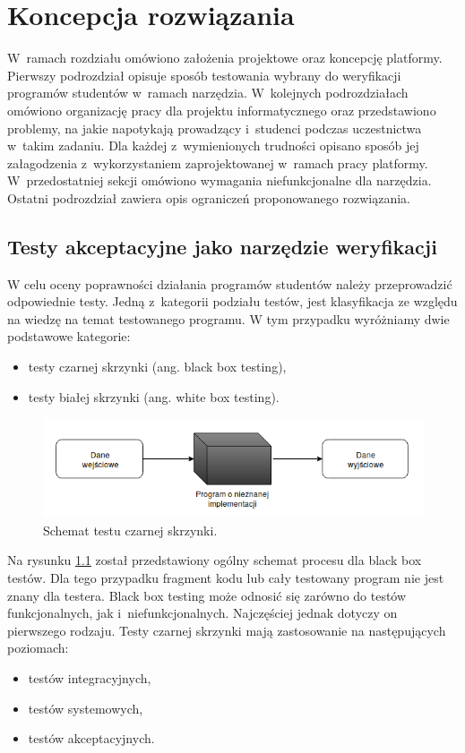 \chapter{Koncepcja rozwiązania}
\label{chapter:requirements}

W~ramach rozdziału omówiono założenia projektowe oraz koncepcję platformy.
Pierwszy podrozdział opisuje sposób testowania wybrany do weryfikacji programów studentów w~ramach narzędzia.
W~kolejnych podrozdziałach omówiono organizację pracy dla projektu informatycznego oraz przedstawiono problemy, na jakie napotykają prowadzący i~studenci podczas uczestnictwa w~takim zadaniu.
Dla każdej z~wymienionych trudności opisano sposób jej załagodzenia z~wykorzystaniem zaprojektowanej w~ramach pracy platformy.
W~przedostatniej sekcji omówiono wymagania niefunkcjonalne dla narzędzia.
Ostatni podrozdział zawiera opis ograniczeń proponowanego rozwiązania.

\section{Testy akceptacyjne jako narzędzie weryfikacji}

W celu oceny poprawności działania programów studentów należy przeprowadzić odpowiednie testy.
Jedną z~kategorii podziału testów, jest klasyfikacja ze względu na wiedzę na temat testowanego programu.
W tym przypadku wyróżniamy dwie podstawowe kategorie:
\begin{itemize}
    \item testy czarnej skrzynki (ang. black box testing),
    \item testy białej skrzynki (ang. white box testing).
\end{itemize}

\begin{figure}[h]
    \centering
    \includegraphics[width = 13cm]{chapter02/black-box.png}
    \caption{Schemat testu czarnej skrzynki.}
    \label{fig:black-box}
\end{figure}

Na rysunku \ref{fig:black-box} został przedstawiony ogólny schemat procesu dla black box testów.
Dla tego przypadku fragment kodu lub cały testowany program nie jest znany dla testera.
Black box testing może odnosić się zarówno do testów funkcjonalnych, jak i~niefunkcjonalnych.
Najczęściej jednak dotyczy on pierwszego rodzaju.
Testy czarnej skrzynki mają zastosowanie na następujących poziomach:
\begin{itemize}
    \item testów integracyjnych,
    \item testów systemowych,
    \item testów akceptacyjnych.
\end{itemize}

